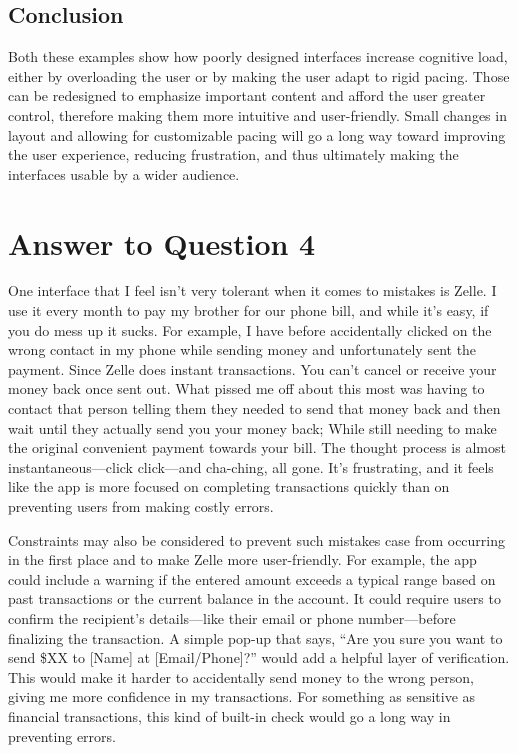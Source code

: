 \documentclass[
	letterpaper, %
]{jdf}
\begin{document}
\subsection{Conclusion}

Both these examples show how poorly designed interfaces increase cognitive load, either by overloading the user or by making the user adapt to rigid pacing. Those can be redesigned to emphasize important content and afford the user greater control, therefore making them more intuitive and user-friendly. Small changes in layout and allowing for customizable pacing will go a long way toward improving the user experience, reducing frustration, and thus ultimately making the interfaces usable by a wider audience.



\newpage

\section{Answer to Question 4}
One interface that I feel isn’t very tolerant when it comes to mistakes is Zelle. I use it every month to pay my brother for our phone bill, and while it’s easy, if you do mess up it sucks. For example, I have before accidentally clicked on the wrong contact in my phone while sending money and unfortunately sent the payment. Since Zelle does instant transactions. You can’t cancel or receive your money back once sent out. What pissed me off about this most was having to contact that person telling them they needed to send that money back and then wait until they actually send you your money back; While still needing to make the original convenient payment towards your bill. The thought process is almost instantaneous—click click—and cha-ching, all gone. It’s frustrating, and it feels like the app is more focused on completing transactions quickly than on preventing users from making costly errors. 

Constraints may also be considered to prevent such mistakes case from occurring in the first place and to make Zelle more user-friendly.  For example, the app could include a warning if the entered amount exceeds a typical range based on past transactions or the current balance in the account. It could require users to confirm the recipient’s details—like their email or phone number—before finalizing the transaction. A simple pop-up that says, “Are you sure you want to send \$XX to [Name] at [Email/Phone]?” would add a helpful layer of verification. This would make it harder to accidentally send money to the wrong person, giving me more confidence in my transactions. For something as sensitive as financial transactions, this kind of built-in check would go a long way in preventing errors.
\end{document}
